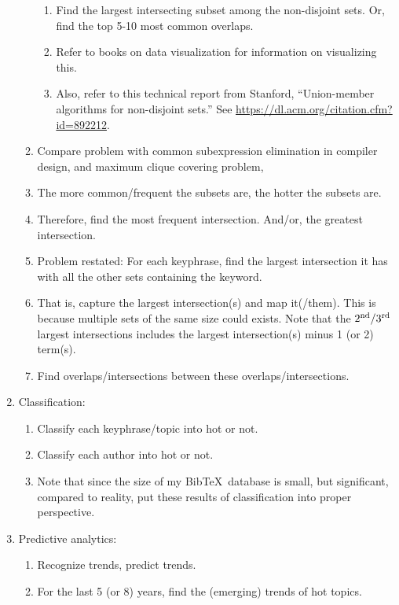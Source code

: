\begin{enumerate}
\begin{enumerate}
\begin{enumerate}
		\item Find the largest intersecting subset among the non-disjoint sets. Or, find the top 5-10 most common overlaps.
		\item Refer to books on data visualization for information on visualizing this.
		\item Also, refer to this technical report from Stanford, ``Union-member algorithms for non-disjoint sets.'' See \url{https://dl.acm.org/citation.cfm?id=892212}.
		\end{enumerate}
	\item Compare problem with common subexpression elimination in compiler design, and maximum clique covering problem,
	\item The more common/frequent the subsets are, the hotter the subsets are.
	\item Therefore, find the most frequent intersection. And/or, the greatest intersection.
	\item Problem restated: For each keyphrase, find the largest intersection it has with all the other sets containing the keyword.
	\item That is, capture the largest intersection(s) and map it(/them). This is because multiple sets of the same size could exists. Note that the $2^{\rm nd}/3^{\rm rd}$ largest intersections includes the largest intersection(s) minus 1 (or 2) term(s).
	\item Find overlaps/intersections between these overlaps/intersections.
	\end{enumerate}
\item Classification: \vspace{-0.3cm}
	\begin{enumerate} \itemsep -2pt
	\item Classify each keyphrase/topic into hot or not.
	\item Classify each author into hot or not.
	\item Note that since the size of my {\sc Bib}\TeX\ database is small, but significant, compared to reality, put these results of classification into proper perspective.
	\end{enumerate}
\item Predictive analytics: \vspace{-0.3cm}
	\begin{enumerate} \itemsep -2pt
	\item Recognize trends, predict trends.
	\item For the last 5 (or 8) years, find the (emerging) trends of hot topics.

\end{enumerate}
\end{enumerate}
